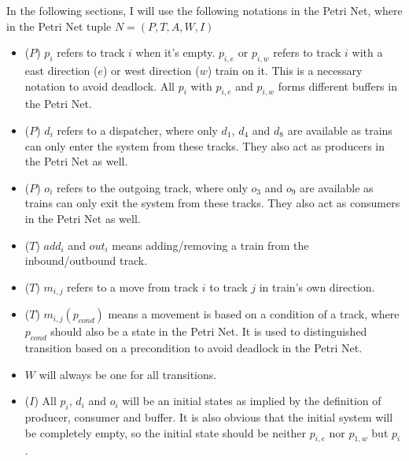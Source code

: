 \documentclass[12pt]{article}
\begin{document}
\begin{itemize}
\end{itemize}

In the following sections, I will use the following notations in the Petri Net, where in the Petri Net tuple $N=\left(P,T,A,W,I\right)$

\begin{itemize}
  \item ($P$) $p_i$ refers to track $i$ when it's empty. $p_{i,e}$ or $p_{i,w}$ refers to track $i$ with a east direction ($e$) or west direction ($w$) train on it. This is a necessary notation to avoid deadlock.  All $p_i$ with $p_{i,e}$ and $p_{i,w}$ forms different buffers in the Petri Net.
  \item ($P$) $d_i$ refers to a dispatcher, where only $d_1$, $d_4$ and $d_8$ are available as trains can only enter the system from these tracks. They also act as producers in the Petri Net as well.
  \item ($P$) $o_i$ refers to the outgoing track, where only $o_3$ and $o_9$ are available as trains can only exit the system from these tracks. They also act as consumers in the Petri Net as well.
  \item ($T$) ${add_i}$ and ${out_i}$ means adding/removing a train from the inbound/outbound track.
  \item ($T$) $m_{i,j}$ refers to a move from track $i$ to track $j$ in train's own direction.
  \item ($T$) $m_{i,j}\left({p_{cond}}\right)$ means a movement is based on a condition of a track, where $p_{cond}$ should also be a state in the Petri Net. It is used to distinguished transition based on a precondition to avoid deadlock in the Petri Net.
  \item $W$ will always be one for all transitions.
  \item ($I$) All $p_i$, $d_i$ and $o_i$ will be an initial states as implied by the definition of producer, consumer and buffer. It is also obvious that the initial system will be completely empty, so the initial state should be neither $p_{i,e}$ nor $p_{1,w}$ but $p_i$.
\end{itemize}
\end{document}
